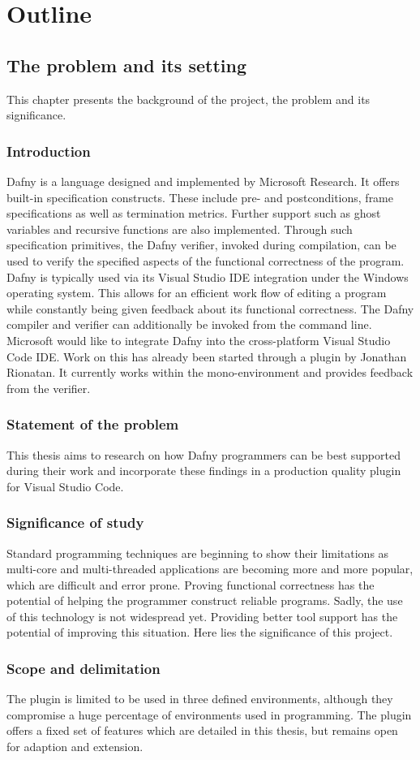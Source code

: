 \section{Outline}
\subsection{The problem and its setting}
This chapter presents the background of the project, the problem and its significance.
\subsubsection{Introduction}
Dafny is a language designed and implemented by Microsoft Research. It offers built-in specification constructs. These include pre- and postconditions, frame specifications as well as termination metrics. Further support such as ghost variables and recursive functions are also implemented. Through such specification primitives, the Dafny verifier, invoked during compilation, can be used to verify the specified aspects of the functional correctness of the program. \newline
Dafny is typically used via its Visual Studio IDE integration under the Windows operating system. This allows for an efficient work flow of editing a program while constantly being given feedback about its functional correctness. The Dafny compiler and verifier can additionally be invoked from the command line. \newline
Microsoft would like to integrate Dafny into the cross-platform Visual Studio Code IDE. Work on this has already been started through a plugin by Jonathan Rionatan. It currently works within the mono-environment and provides feedback from the verifier. 
\subsubsection{Statement of the problem}
This thesis aims to research on how Dafny programmers can be best supported during their work and incorporate these findings in a production quality plugin for Visual Studio Code. 
\subsubsection{Significance of study}
Standard programming techniques are beginning to show their limitations as multi-core and multi-threaded applications are becoming more and more popular, which are difficult and error prone.
Proving functional correctness has the potential of helping the programmer construct reliable programs.
Sadly, the use of this technology is not widespread yet. Providing better tool support has the potential of improving this situation. Here lies the significance of this project.
\subsubsection{Scope and delimitation}
The plugin is limited to be used in three defined environments, although they compromise a huge percentage of environments used in programming. The plugin offers a fixed set of features which are detailed in this thesis, but remains open for adaption and extension.
